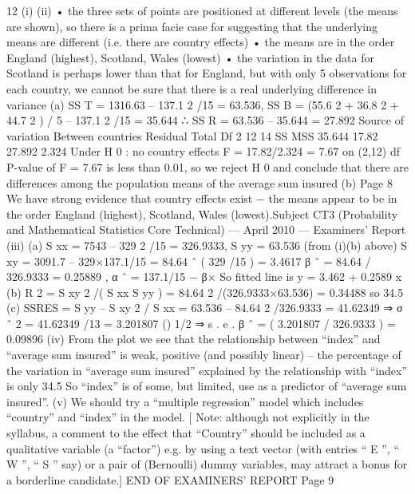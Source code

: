 12
(i)
(ii)
• the three sets of points are positioned at different levels (the means are
shown), so there is a prima facie case for suggesting that the underlying
means are different (i.e. there are country effects)
• the means are in the order England (highest), Scotland, Wales (lowest)
• the variation in the data for Scotland is perhaps lower than that for
England, but with only 5 observations for each country, we cannot be sure
that there is a real underlying difference in variance
(a)
SS T = 1316.63 – 137.1 2 /15 = 63.536, SS B = (55.6 2 + 36.8 2 + 44.7 2 ) /
5 – 137.1 2 /15 = 35.644
∴ SS R = 63.536 – 35.644 = 27.892
Source of variation
Between countries
Residual
Total
Df
2
12
14
SS
MSS
35.644 17.82
27.892 2.324
Under H 0 : no country effects F = 17.82/2.324 = 7.67 on (2,12) df
P-value of F = 7.67 is less than 0.01, so we reject H 0 and conclude that
there are differences among the population means of the average sum
insured
(b)
Page 8
We have strong evidence that country effects exist − the means appear
to be in the order England (highest), Scotland, Wales (lowest).Subject CT3 (Probability and Mathematical Statistics Core Technical) — April 2010 — Examiners’ Report
(iii)
(a)
S xx = 7543 – 329 2 /15 = 326.9333, S yy = 63.536 (from (i)(b) above)
S xy = 3091.7 – 329×137.1/15 = 84.64
ˆ ( 329 /15 ) = 3.4617
β ˆ = 84.64 / 326.9333 = 0.25889 , α ˆ = 137.1/15 − β×
So fitted line is y = 3.462 + 0.2589 x
(b) R 2 = S xy 2 /( S xx S yy ) = 84.64 2 /(326.9333×63.536) = 0.34488 so 34.5%
(c) SSRES = S yy – S xy 2 / S xx = 63.536 – 84.64 2 /326.9333 = 41.62349
⇒ σ ˆ 2 = 41.62349 /13 = 3.201807
()
1/2
⇒ s . e . β ˆ = ( 3.201807 / 326.9333 ) = 0.09896
(iv)
From the plot we see that the relationship between “index” and “average sum
insured” is weak, positive (and possibly linear) – the percentage of the
variation in “average sum insured” explained by the relationship with “index”
is only 34.5%
So “index” is of some, but limited, use as a predictor of “average sum
insured”.
(v)
We should try a “multiple regression” model which includes “country” and
“index” in the model.
[ Note: although not explicitly in the syllabus, a comment to the effect that
“Country” should be included as a qualitative variable (a “factor”) e.g. by
using a text vector (with entries “ E ”, “ W ”, “ S ” say) or a pair of (Bernoulli)
dummy variables, may attract a bonus for a borderline candidate.]
END OF EXAMINERS’ REPORT
Page 9
